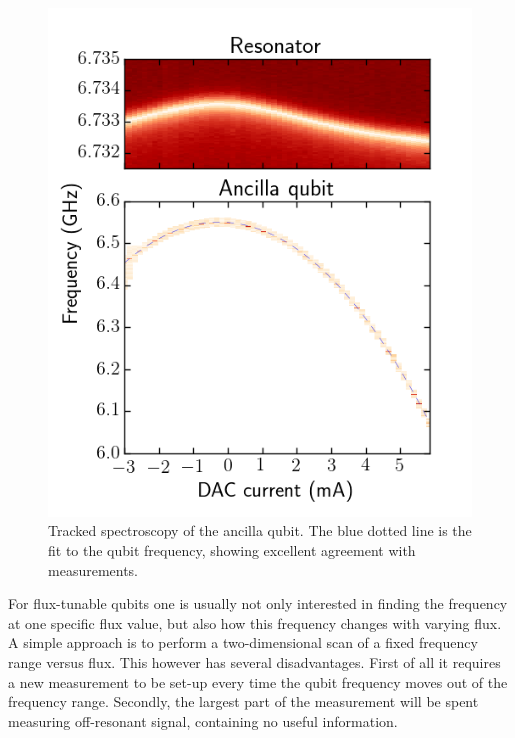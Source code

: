         \begin{figure}
          \begin{center}
          \vspace{-30pt}
            \includegraphics[width=\textwidth]{Figures/Qubit characterization/Tracked_spectroscopy.png}
          \end{center}
          \vspace{-20 pt}
          \caption{Tracked spectroscopy of the ancilla qubit. The blue dotted line is the fit to the qubit frequency, showing excellent agreement with measurements.}
          \label{fig:tracked spectroscopy}
        \end{figure}

        For flux-tunable qubits one is usually not only interested in finding the frequency at one specific flux value, but also how this frequency changes with varying flux. A simple approach is to perform a two-dimensional scan of a fixed frequency range versus flux. This however has several disadvantages. First of all it requires a new measurement to be set-up every time the qubit frequency moves out of the frequency range. Secondly, the largest part of the measurement will be spent measuring off-resonant signal, containing no useful information.

